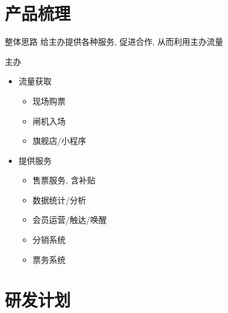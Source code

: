 \documentclass[presentation, bigger]{beamer}
\begin{document}
\section{产品梳理}
\label{sec:orgb0ec1e4}
\begin{frame}[label={sec:org43ea52e}]{整体思路}
给主办提供各种服务, 促进合作, 从而利用主办流量
\end{frame}
\begin{frame}[label={sec:orga4cb9bc}]{主办}
\begin{itemize}
\item 流量获取
\begin{itemize}
\item 现场购票
\item 闸机入场
\item 旗舰店/小程序
\end{itemize}
\item 提供服务
\begin{itemize}
\item 售票服务, 含补贴
\item 数据统计/分析
\item 会员运营/触达/唤醒
\item 分销系统
\item 票务系统
\end{itemize}
\end{itemize}
\end{frame}

\section{研发计划}
\label{sec:orgc7b248e}
\end{document}
